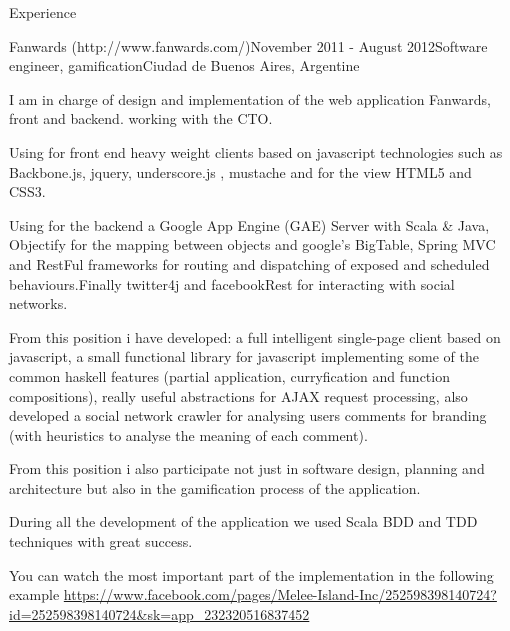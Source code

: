 \documentclass{resume} %
\begin{document}
\begin{rSection}{Experience}
\begin{rSubsection}{Fanwards (http://www.fanwards.com/)}{November 2011 - August 2012}{Software engineer, gamification}{Ciudad de Buenos Aires, Argentine}
\item I am in charge of design and implementation of the web application Fanwards, front and backend. working with the CTO.
\item Using for front end heavy weight clients based on javascript technologies such as Backbone.js, jquery, underscore.js , mustache and for the view HTML5 and CSS3.
\item Using for the backend a Google App Engine (GAE) Server with Scala \& Java, Objectify for the mapping between objects and google's BigTable, Spring MVC and RestFul frameworks for routing and dispatching of exposed and scheduled behaviours.Finally twitter4j and facebookRest for interacting with social networks.  
\item From this position i have developed: a full intelligent single-page client based on javascript,  a small functional library for javascript implementing some of the common haskell features (partial application, curryfication and function compositions), really useful abstractions for AJAX request processing, also developed a social network crawler for analysing users comments for branding (with heuristics to analyse the meaning of each comment). 
\item From this position i also participate not just in software design, planning and architecture but also in the gamification process of the application.
\item During all the development of the application we used Scala BDD and TDD techniques with great success. 
\item You can watch the most important part of the implementation in the following example \url{https://www.facebook.com/pages/Melee-Island-Inc/252598398140724?id=252598398140724&sk=app_232320516837452}
\end{rSubsection}



\end{rSection}
\end{document}
